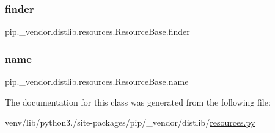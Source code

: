 \subsubsection{\texorpdfstring{finder}{finder}}
{\footnotesize\ttfamily pip.\+\_\+vendor.\+distlib.\+resources.\+Resource\+Base.\+finder}

\mbox{\label{classpip_1_1__vendor_1_1distlib_1_1resources_1_1ResourceBase_a19a71ce38fa771d3b4ecb6de30888905}} 
\subsubsection{\texorpdfstring{name}{name}}
{\footnotesize\ttfamily pip.\+\_\+vendor.\+distlib.\+resources.\+Resource\+Base.\+name}



The documentation for this class was generated from the following file\+:\begin{DoxyCompactItemize}
\item 
venv/lib/python3./site-\/packages/pip/\+\_\+vendor/distlib/\hyperlink{resources_8py}{resources.\+py}\end{DoxyCompactItemize}

